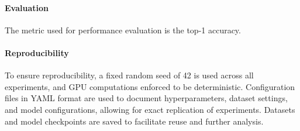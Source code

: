 \paragraph{Evaluation}
The metric used for performance evaluation is the top-1 accuracy.


\paragraph{Reproducibility}
To ensure reproducibility, a fixed random seed of 42 is used across all experiments, and GPU computations enforced to be deterministic. Configuration files in YAML format are used to document hyperparameters, dataset settings, and model configurations, allowing for exact replication of experiments. Datasets and model checkpoints are saved to facilitate reuse and further analysis.

